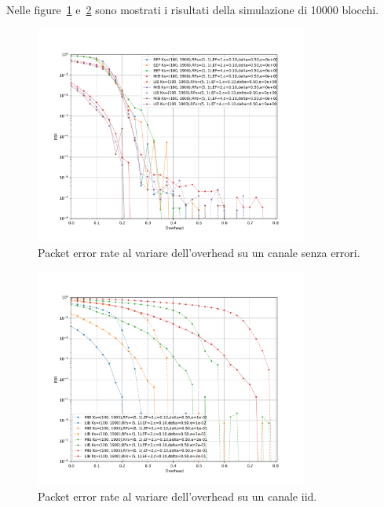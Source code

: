 \documentclass[italian, a4paper, 12pt]{article}
\begin{document}
Nelle figure~\ref{fig:zero_oh} e~\ref{fig:iid_oh} sono mostrati i
risultati della simulazione di 10000 blocchi.
%
\begin{figure}[htb]
  \centering
  \includegraphics[width=0.8\textwidth]{plot_ber_zero_oh}
  \caption{Packet error rate al variare dell'overhead su un canale
    senza errori.}
  \label{fig:zero_oh}
\end{figure}
%
\begin{figure}[htb]
  \centering
  \includegraphics[width=0.8\textwidth]{plot_ber_iid}
  \caption{Packet error rate al variare dell'overhead su un canale
    iid.}
  \label{fig:iid_oh}
\end{figure}

%
% 
\end{document}
